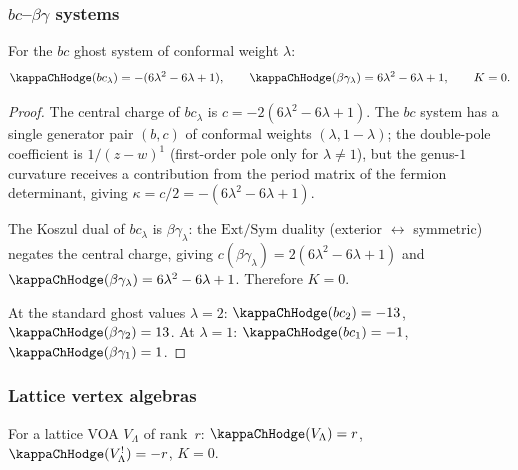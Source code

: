 \subsubsection{\texorpdfstring{$bc$--$\beta\gamma$}{bc-betagamma} systems}

\begin{proposition}
\label{prop:thqg-IV-bc-bg-K}
For the $bc$ ghost system of conformal weight $\lambda$:
\begin{equation}%
\kappaChHodge(bc_\lambda) = -(6\lambda^2 - 6\lambda + 1),
\qquad
\kappaChHodge(\beta\gamma_\lambda) = 6\lambda^2 - 6\lambda + 1,
\qquad
K = 0.
\end{equation}
\end{proposition}

\begin{proof}
The central charge of $bc_\lambda$ is $c = -2(6\lambda^2 - 6\lambda + 1)$.
The $bc$ system has a single generator pair $(b, c)$ of conformal weights
$(\lambda, 1 - \lambda)$; the double-pole coefficient is $1/(z-w)^1$
(first-order pole only for $\lambda \neq 1$), but the genus-$1$
curvature receives a contribution from the period matrix of the
fermion determinant, giving $\kappa = c/2 = -(6\lambda^2 - 6\lambda + 1)$.

The Koszul dual of $bc_\lambda$ is $\beta\gamma_\lambda$: the
$\mathrm{Ext}/\mathrm{Sym}$ duality (exterior $\leftrightarrow$
symmetric) negates the central charge, giving
$c(\beta\gamma_\lambda) = 2(6\lambda^2 - 6\lambda + 1)$ and
$\kappaChHodge(\beta\gamma_\lambda) = 6\lambda^2 - 6\lambda + 1$.
Therefore $K = 0$.

At the standard ghost values $\lambda = 2$: $\kappaChHodge(bc_2) = -13$,
$\kappaChHodge(\beta\gamma_2) = 13$.
At $\lambda = 1$: $\kappaChHodge(bc_1) = -1$, $\kappaChHodge(\beta\gamma_1) = 1$.
\end{proof}

\subsubsection{Lattice vertex algebras}

\begin{proposition}
For a lattice VOA $V_\Lambda$ of rank~$r$:
$\kappaChHodge(V_\Lambda) = r$, $\kappaChHodge(V_\Lambda^!) = -r$, $K = 0$.
\end{proposition}

